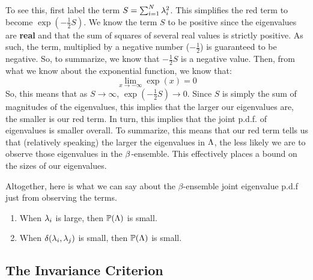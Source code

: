 To see this, first label the term $S = \sum_{i = 1}^N \lambda_i^2$. This simplifies the red term to become $\exp(-\frac{1}{2} S)$.
We know the term $S$ to be positive since the eigenvalues are \textbf{real} and that the sum of squares of several real values is strictly positive.
As such, the term, multiplied by a negative number ($-\frac{1}{2}$) is guaranteed to be negative. So, to summarize, we know that $-\frac{1}{2} S$ is a negative value.
Then, from what we know about the exponential function, we know that:
$$\lim_{x \to -\infty} \exp(x) = 0$$
So, this means that as $S \to \infty$, $\exp(-\frac{1}{2}S) \to 0$. Since $S$ is simply the sum of magnitudes of the eigenvalues, this implies that the larger our eigenvalues
are, the smaller is our red term. In turn, this implies that the joint p.d.f. of eigenvalues is smaller overall.
To summarize, this means that our red term tells us that (relatively speaking) the larger the eigenvalues in $\Lambda$, the less likely we are to observe those eigenvalues in the $\beta$-ensemble. This effectively places a bound on the sizes of our eigenvalues.

\bigskip

 Altogether, here is what we can say about the $\beta$-ensemble joint eigenvalue p.d.f just from observing the terms.
  \begin{enumerate}
    \item When $\lambda_i$ is large, then $\mathbb{P}(\Lambda)$ is small.
    \item When $\delta(\lambda_i, \lambda_j)$ is small, then $\mathbb{P}(\Lambda)$ is small.
  \end{enumerate}

\newpage
\subsection{The Invariance Criterion}


